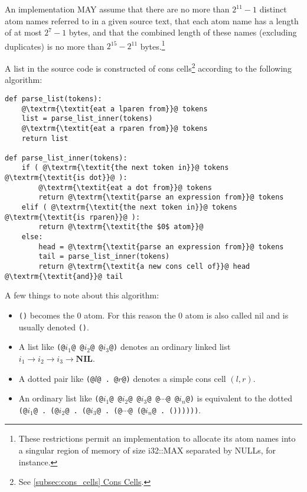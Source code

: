 \documentclass[twocolumn]{report}
\newcommand{\intralink}[2]{\hyperref[#1]{\ref*{#1} #2}}
\begin{document}
An implementation MAY assume that there are no more than $2^{11} - 1$ distinct atom names referred to in a given source text, that each atom name has a length of at most $2^7 - 1$ bytes, and that the combined length of these names (excluding duplicates) is no more than $2^{15} - 2^{11}$ bytes.\footnote{These restrictions permit an implementation to allocate its atom names into a singular region of memory of size i32::MAX separated by NULLs, for instance.}

\clearpage

A list in the source code is constructed of cons cells\footnote{See \intralink{subsec:cons_cells}{Cons Cells}.} according to the following algorithm:

\begin{verbatim}
def parse_list(tokens):
    @\textrm{\textit{eat a lparen from}}@ tokens
    list = parse_list_inner(tokens)
    @\textrm{\textit{eat a rparen from}}@ tokens
    return list

def parse_list_inner(tokens):
    if ( @\textrm{\textit{the next token in}}@ tokens @\textrm{\textit{is dot}}@ ):
        @\textrm{\textit{eat a dot from}}@ tokens
        return @\textrm{\textit{parse an expression from}}@ tokens
    elif ( @\textrm{\textit{the next token in}}@ tokens @\textrm{\textit{is rparen}}@ ):
        return @\textrm{\textit{the $0$ atom}}@
    else:
        head = @\textrm{\textit{parse an expression from}}@ tokens
        tail = parse_list_inner(tokens)
        return @\textrm{\textit{a new cons cell of}}@ head @\textrm{\textit{and}}@ tail
\end{verbatim}

A few things to note about this algorithm:

\begin{itemize}
\item \texttt{()} becomes the $0$ atom.
For this reason the $0$ atom is also called nil and is usually denoted \texttt{()}.
\item A list like \texttt{(@$i_1$@ @$i_2$@ @$i_3$@)} denotes an ordinary linked list $i_1 \rightarrow i_2 \rightarrow i_3 \rightarrow \textbf{NIL}$.
\item A dotted pair like \texttt{(@$l$@ . @$r$@)} denotes a simple cons cell $\left(l, r\right)$.
\item An ordinary list like \texttt{(@$i_1$@ @$i_2$@ @$i_3$@ @$\cdots$@ @$i_n$@)} is equivalent to the dotted \texttt{(@$i_1$@ . (@$i_2$@ . (@$i_3$@ . (@$\cdots$@ (@$i_n$@ . ())))))}.
\end{itemize}
\end{document}
